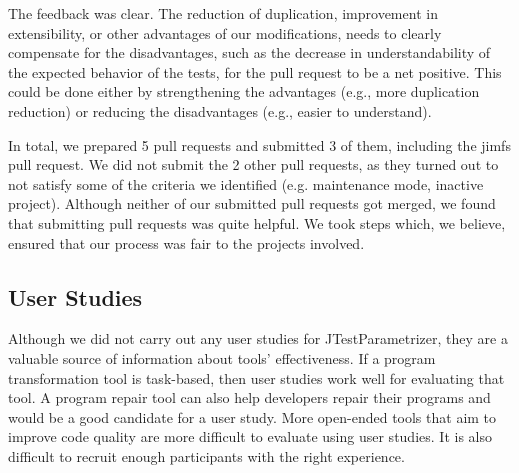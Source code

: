 The feedback was clear. The reduction of duplication, improvement in extensibility, or other advantages of our modifications, needs to clearly compensate for the disadvantages, such as the decrease in understandability of the expected behavior of the tests, for the pull request to be a net positive. This could be done either by strengthening the advantages (e.g., more duplication reduction) or reducing the disadvantages (e.g., easier to understand).

In total, we prepared 5 pull requests and submitted 3 of them, including the jimfs pull request. We did not submit the 2 other pull requests, as they turned out to not satisfy some of the criteria we identified (e.g. maintenance mode, inactive project). Although neither of our submitted pull requests got merged, we found that submitting pull requests was quite helpful. We took steps which, we believe, ensured that our process was fair to the projects involved.



\subsection{User Studies}
Although we did not carry out any user studies for JTestParametrizer, they
are a valuable source of information about tools' effectiveness. 
If a program transformation tool is task-based, then user studies work
well for evaluating that tool. A program repair tool can also help developers
repair their programs and would be a good candidate for a user study.
More open-ended tools that aim to improve code quality are more difficult
to evaluate using user studies. It is also
difficult to recruit enough participants with the right experience.

